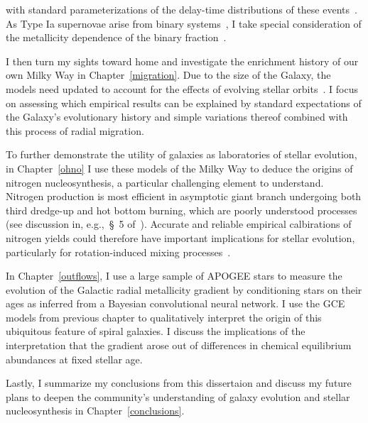 \documentclass[main.tex]{subfiles}
\begin{document}
\begin{doublespace}
\citep{Behroozi2019} with standard parameterizations of the delay-time
distributions of these events~\citep[e.g.,][]{Maoz2012a, Maoz2012b}.
As Type Ia supernovae arise from binary systems~\citep{Whelan1973, Iben1984,
Webbink1984}, I take special consideration of the metallicity dependence
of the binary fraction~\citep{Badenes2018, Moe2019}.
\par
I then turn my sights toward home and investigate the enrichment history
of our own Milky Way in Chapter~\ref{migration}.
Due to the size of the Galaxy, the models need updated to account for the
effects of evolving stellar orbits~\citep[e.g.,][]{Sellwood2002,
Schoenrich2009a}.
I focus on assessing which empirical results can be explained by standard
expectations of the Galaxy's evolutionary history and simple variations thereof
combined with this process of radial migration.
\par
To further demonstrate the utility of galaxies as laboratories of stellar
evolution, in Chapter~\ref{ohno} I use these models of the Milky Way
to deduce the origins of nitrogen nucleosynthesis, a particular challenging
element to understand.
Nitrogen production is most efficient in asymptotic giant branch undergoing
both third dredge-up and hot bottom burning, which are poorly understood
processes (see discussion in, e.g.,~\S~5 of~\citealt{Karakas2016}).
Accurate and reliable empirical calbirations of nitrogen yields could therefore
have important implications for stellar evolution, particularly for
rotation-induced mixing processes~\citep[e.g.,][]{Heger2010, Frischknecht2016}.
\par
In Chapter~\ref{outflows}, I use a large sample of APOGEE stars to measure the
evolution of the Galactic radial metallicity gradient by conditioning stars on
their ages as inferred from a Bayesian convolutional neural network.
I use the GCE models from previous chapter to qualitatively interpret the
origin of this ubiquitous feature of spiral galaxies.
I discuss the implications of the interpretation that the gradient arose out of
differences in chemical equilibrium abundances at fixed stellar age.
\par
Lastly, I summarize my conclusions from this dissertaion and discuss my
future plans to deepen the community's understanding of galaxy evolution and
stellar nucleosynthesis in Chapter~\ref{conclusions}.

\end{doublespace}
\end{document}
